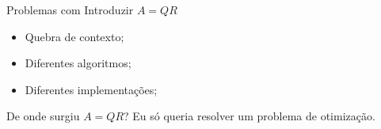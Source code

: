 
\begin{frame}{Problemas com Introduzir $A = QR$}
  \begin{itemize}
    \item Quebra de contexto; \\[0.5cm] \pause
    \item Diferentes algoritmos; \\[0.5cm] \pause
    \item Diferentes implementações; \pause
  \end{itemize}

  \vspace{1cm}

  \begin{center}
    De onde surgiu $A = QR$? Eu só queria resolver um problema de otimização.
  \end{center}
\end{frame}
